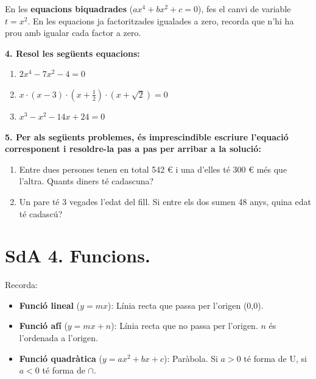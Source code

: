 \documentclass[12pt,a4paper]{article}
\begin{document}
\begin{capsula}
En les \textbf{equacions biquadrades} ($ax^4 + bx^2 + c = 0$), fes el canvi de variable $t = x^2$. En les equacions ja factoritzades igualades a zero, recorda que n'hi ha prou amb igualar cada factor a zero.
\end{capsula}

\textbf{4. Resol les següents equacions:}
\begin{enumerate}[label=\alph*)]
    \item $2x^4 - 7x^2 - 4 = 0$ \vspace{2cm}
    \item $x \cdot (x - 3) \cdot \left(x + \frac{1}{2}\right) \cdot (x + \sqrt{2}) = 0$ \vspace{1.5cm}
    \item $x^3 - x^2 - 14x + 24 = 0$ \vspace{2.5cm}
\end{enumerate}

\newpage

\textbf{5. Per als següents problemes, és imprescindible escriure l’equació corresponent i resoldre-la pas a pas per arribar a la solució:}
\begin{enumerate}[label=\alph*)]
    \item Entre dues persones tenen en total 542 € i una d’elles té 300 € més que l'altra. Quants diners té cadascuna? \vspace{3cm}
    \item Un pare té 3 vegades l’edat del fill. Si entre els dos sumen 48 anys, quina edat té cadascú? \vspace{3cm}
\end{enumerate}

\newpage
\section*{SdA 4. Funcions.}

\begin{capsula}
Recorda:
\begin{itemize}[topsep=0pt, itemsep=0pt]
    \item \textbf{Funció lineal} ($y=mx$): Línia recta que passa per l'origen (0,0).
    \item \textbf{Funció afí} ($y=mx+n$): Línia recta que no passa per l'origen. $n$ és l'ordenada a l'origen.
    \item \textbf{Funció quadràtica} ($y=ax^2+bx+c$): Paràbola. Si $a>0$ té forma de U, si $a<0$ té forma de $\cap$.
\end{itemize}
\end{capsula}
\end{document}
